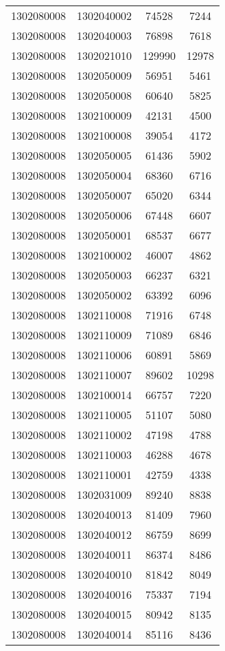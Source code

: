 \begin{longtable}[h]{llcc}
		1302080008 & 1302040002 & 74528 & 7244\\
		1302080008 & 1302040003 & 76898 & 7618\\
		1302080008 & 1302021010 & 129990 & 12978\\
		1302080008 & 1302050009 & 56951 & 5461\\
		1302080008 & 1302050008 & 60640 & 5825\\
		1302080008 & 1302100009 & 42131 & 4500\\
		1302080008 & 1302100008 & 39054 & 4172\\
		1302080008 & 1302050005 & 61436 & 5902\\
		1302080008 & 1302050004 & 68360 & 6716\\
		1302080008 & 1302050007 & 65020 & 6344\\
		1302080008 & 1302050006 & 67448 & 6607\\
		1302080008 & 1302050001 & 68537 & 6677\\
		1302080008 & 1302100002 & 46007 & 4862\\
		1302080008 & 1302050003 & 66237 & 6321\\
		1302080008 & 1302050002 & 63392 & 6096\\
		1302080008 & 1302110008 & 71916 & 6748\\
		1302080008 & 1302110009 & 71089 & 6846\\
		1302080008 & 1302110006 & 60891 & 5869\\
		1302080008 & 1302110007 & 89602 & 10298\\
		1302080008 & 1302100014 & 66757 & 7220\\
		1302080008 & 1302110005 & 51107 & 5080\\
		1302080008 & 1302110002 & 47198 & 4788\\
		1302080008 & 1302110003 & 46288 & 4678\\
		1302080008 & 1302110001 & 42759 & 4338\\
		1302080008 & 1302031009 & 89240 & 8838\\
		1302080008 & 1302040013 & 81409 & 7960\\
		1302080008 & 1302040012 & 86759 & 8699\\
		1302080008 & 1302040011 & 86374 & 8486\\
		1302080008 & 1302040010 & 81842 & 8049\\
		1302080008 & 1302040016 & 75337 & 7194\\
		1302080008 & 1302040015 & 80942 & 8135\\
		1302080008 & 1302040014 & 85116 & 8436\\

\end{longtable}
